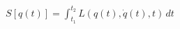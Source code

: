 \documentclass[preview]{standalone}
\begin{document}
\begin{align*}
S[q(t)] = \int_{t_1}^{t_2} L(q(t), \dot{q}(t), t) \, dt
\end{align*}
\end{document}

